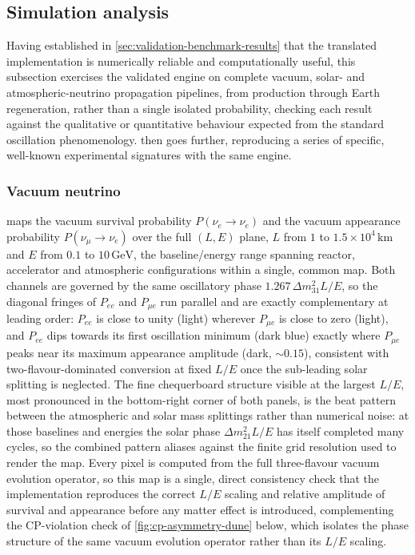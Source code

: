 \subsection{Simulation analysis}
\label{sec:simulation-analysis-results}

Having established in \cref{sec:validation-benchmark-results} that the translated implementation is numerically reliable and computationally useful, this subsection exercises the validated engine on complete vacuum, solar- and atmospheric-neutrino propagation pipelines, from production through Earth regeneration, rather than a single isolated probability, checking each result against the qualitative or quantitative behaviour expected from the standard oscillation phenomenology.  then goes further, reproducing a series of specific, well-known experimental signatures with the same engine.

\subsubsection{Vacuum neutrino}

 maps the vacuum survival probability \(P(\nu_e\to\nu_e)\) and the vacuum appearance probability \(P(\nu_\mu\to\nu_e)\) over the full \((L,E)\) plane, \(L\) from \(1\) to \(1.5\times10^4\,\mathrm{km}\) and \(E\) from \(0.1\) to \(10\,\mathrm{GeV}\), the baseline/energy range spanning reactor, accelerator and atmospheric configurations within a single, common map. Both channels are governed by the same oscillatory phase \(1.267\,\Delta m^2_{31}L/E\), so the diagonal fringes of \(P_{ee}\) and \(P_{\mu e}\) run parallel and are exactly complementary at leading order: \(P_{ee}\) is close to unity (light) wherever \(P_{\mu e}\) is close to zero (light), and \(P_{ee}\) dips towards its first oscillation minimum (dark blue) exactly where \(P_{\mu e}\) peaks near its maximum appearance amplitude (dark, \(\sim0.15\)), consistent with two-flavour-dominated conversion at fixed \(L/E\) once the sub-leading solar splitting is neglected. The fine chequerboard structure visible at the largest \(L/E\), most pronounced in the bottom-right corner of both panels, is the beat pattern between the atmospheric and solar mass splittings rather than numerical noise: at those baselines and energies the solar phase \(\Delta m^2_{21}L/E\) has itself completed many cycles, so the combined pattern aliases against the finite grid resolution used to render the map. Every pixel is computed from the full three-flavour vacuum evolution operator, so this map is a single, direct consistency check that the implementation reproduces the correct \(L/E\) scaling and relative amplitude of survival and appearance before any matter effect is introduced, complementing the CP-violation check of \cref{fig:cp-asymmetry-dune} below, which isolates the phase structure of the same vacuum evolution operator rather than its \(L/E\) scaling.

